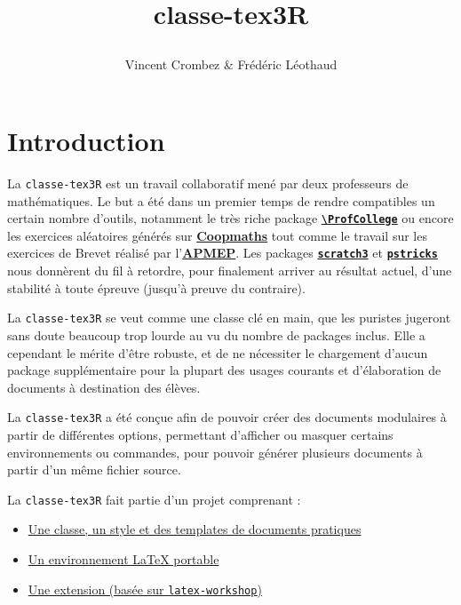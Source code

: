 \documentclass{classe-tex3R}
\title{\bfseries classe-tex3R\par}
\author{Vincent Crombez \& Frédéric Léothaud}
\date{}
\begin{document}
\maketitle

\newpage

\tableofcontents

\newpage

{}
\section*{Introduction}

La \texttt{classe-tex3R} est un travail collaboratif mené par deux professeurs de mathématiques. Le but a été dans un premier temps de rendre compatibles un certain nombre d'outils, notamment le très riche package \href{https://ctan.org/pkg/profcollege}{\texttt{\textbf{\textbackslash ProfCollege}}} ou encore les exercices aléatoires générés sur \href{https://coopmaths.fr/}{\textbf{Coopmaths}} tout comme le travail sur les exercices de Brevet réalisé par l'\href{https://www.apmep.fr/Annales-du-Brevet-des-colleges}{\textbf{APMEP}}. Les packages \href{https://www.ctan.org/pkg/scratch3}{\textbf{\texttt{scratch3}}} et \href{https://www.ctan.org/pkg/pstricks-base}{\textbf{\texttt{pstricks}}} nous donnèrent du fil à retordre, pour finalement arriver au résultat actuel, d'une stabilité  à toute épreuve (jusqu'à preuve du contraire).

La \texttt{classe-tex3R} se veut comme une classe clé en main, que les puristes jugeront sans doute beaucoup trop lourde au vu du nombre de packages inclus. Elle a cependant le mérite d'être robuste, et de ne nécessiter le chargement d'aucun package supplémentaire pour la plupart des usages courants et d'élaboration de documents à destination des élèves.

La \texttt{classe-tex3R} a été conçue afin de pouvoir créer des documents modulaires à partir de différentes options, permettant d'afficher ou masquer certains environnements ou commandes, pour pouvoir générer plusieurs documents à partir d'un même fichier source.

La \texttt{classe-tex3R} fait partie d'un projet comprenant :
%
\begin{itemize}
  \item \href{https://github.com/Tex3rivieres/TeX3R-ClasseStyle}{Une classe, un style et des templates de documents pratiques}
  \item \href{https://github.com/Tex3rivieres/TeX3R-Portable}{Un environnement LaTeX portable}
  \item \href{https://github.com/Tex3rivieres/TeX3R-Workshop}{Une extension (basée sur \texttt{latex-workshop})}
\end{itemize}
\end{document}
